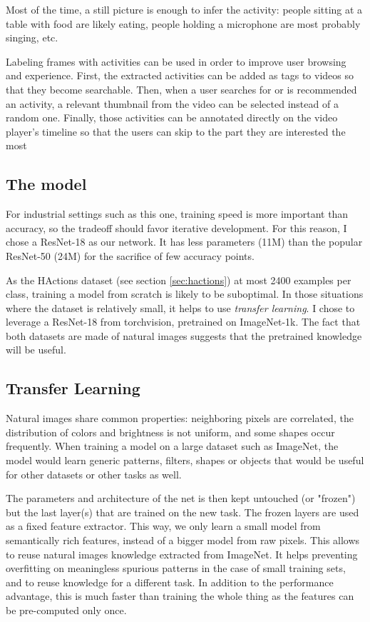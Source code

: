 Most of the time, a still picture is enough to infer the activity: people sitting at a table with food are likely eating, people holding a microphone are most probably singing, etc.

Labeling frames with activities can be used in order to improve user browsing and experience. First, the extracted activities can be added as tags to videos so that they become searchable. Then, when a user searches for or is recommended an activity, a relevant thumbnail from the video can be selected instead of a random one. Finally, those activities can be annotated directly on the video player's timeline so that the users can skip to the part they are interested the most

\subsection{The model}

For industrial settings such as this one, training speed is more important than accuracy, so the tradeoff should favor iterative development. For this reason, I chose a ResNet-18 as our network. It has less parameters (11M) than the popular ResNet-50 (24M) for the sacrifice of few accuracy points.

As the HActions dataset (see section \ref{sec:hactions}) at most 2400 examples per class, training a model from scratch is likely to be suboptimal. In those situations where the dataset is relatively small, it helps to use \emph{transfer learning}. I chose to leverage a ResNet-18 from torchvision, pretrained on ImageNet-1k. The fact that both datasets are made of natural images suggests that the pretrained knowledge will be useful.


\subsection{Transfer Learning}

Natural images share common properties: neighboring pixels are correlated, the distribution of colors and brightness is not uniform, and some shapes occur frequently. When training a model on a large dataset such as ImageNet, the model would learn generic patterns, filters, shapes or objects that would be useful for other datasets or other tasks as well.

The parameters and architecture of the net is then kept untouched (or "frozen") but the last layer(s) that are trained on the new task. The frozen layers are used as a fixed feature extractor. This way, we only learn a small model from semantically rich features, instead of a bigger model from raw pixels. This allows to reuse natural images knowledge extracted from ImageNet. It helps preventing overfitting on meaningless spurious patterns in the case of small training sets, and to reuse knowledge for a different task. In addition to the performance advantage, this is much faster than training the whole thing as the features can be pre-computed only once.

